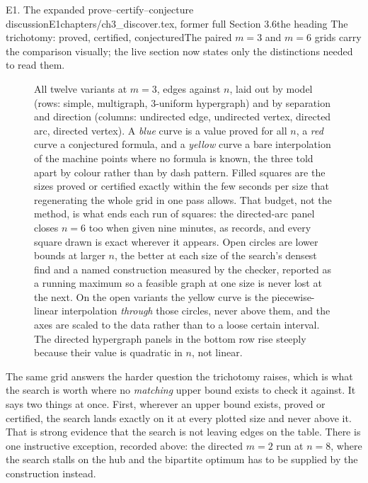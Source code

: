 \begin{offcut}{E1. The expanded prove--certify--conjecture discussion}{E1}{chapters/ch3\_discover.tex, former full Section 3.6}{the heading The trichotomy: proved, certified, conjectured}{The paired $m=3$ and $m=6$ grids carry the comparison visually; the live section now states only the distinctions needed to read them.}
\begin{figure}[htbp]
    \centering
    \caption{All twelve variants at $m = 3$, edges against $n$, laid out by model (rows: simple, multigraph, $3$-uniform hypergraph) and by separation and direction (columns: undirected edge, undirected vertex, directed arc, directed vertex). A \emph{blue} curve is a value proved for all $n$, a \emph{red} curve a conjectured formula, and a \emph{yellow} curve a bare interpolation of the machine points where no formula is known, the three told apart by colour rather than by dash pattern. Filled squares are the sizes  proved or certified exactly within the few seconds per size that regenerating the whole grid in one pass allows. That budget, not the method, is what ends each run of squares: the directed-arc panel closes $n = 6$ too when given nine minutes, as  records, and every square drawn is exact wherever it appears. Open circles are lower bounds at larger $n$, the better at each size of the search's densest find and a named construction measured by the checker, reported as a running maximum so a feasible graph at one size is never lost at the next. On the open variants the yellow curve is the piecewise-linear interpolation \emph{through} those circles, never above them, and the axes are scaled to the data rather than to a loose certain interval. The directed hypergraph panels in the bottom row rise steeply because their value is quadratic in $n$, not linear.}
\end{figure}

The same grid answers the harder question the trichotomy raises, which is what the search is worth where no \emph{matching} upper bound exists to check it against. It says two things at once. First, wherever an upper bound exists, proved or certified, the search lands exactly on it at every plotted size and never above it. That is strong evidence that the search is not leaving edges on the table. There is one instructive exception, recorded above: the directed $m = 2$ run at $n = 8$, where the search stalls on the hub and the bipartite optimum has to be supplied by the construction instead.


\end{offcut}
